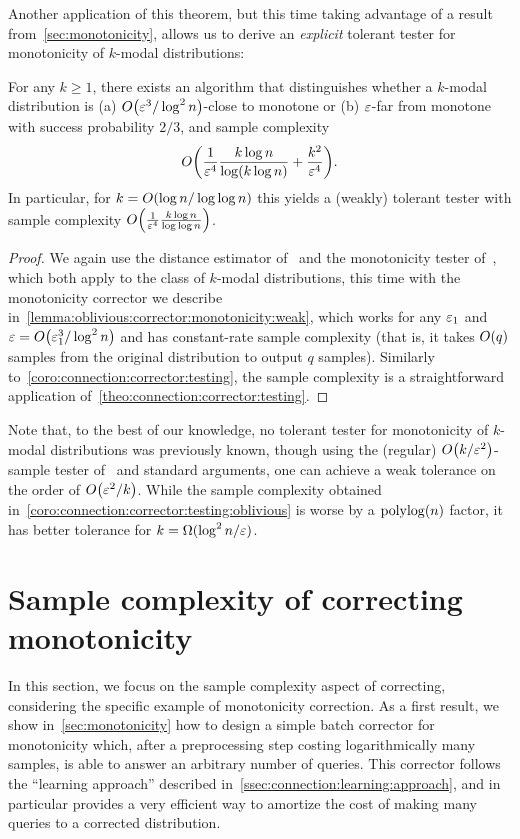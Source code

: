 Another application of this theorem, but this time taking advantage of a result from~\cref{sec:monotonicity}, allows us to derive an \emph{explicit} tolerant tester for monotonicity of $k$-modal distributions:
\begin{corollary}\label{coro:connection:corrector:testing:oblivious}
For any $k\geq 1$, there exists an algorithm that distinguishes whether a $k$-modal distribution is  \textsf{(a)} $\bigO{\eps^3/\log^2 n}$-close to monotone or  \textsf{(b)} $\varepsilon$-far from monotone with success probability $2/3$, and sample complexity
\[
	\bigO{\frac{1}{\eps^4}\frac{k\log n}{\log (k\log n)} +\frac{k^2}{\eps^4} }.
\]
In particular, for $k=\bigO{\log n/\log\log n}$ this yields a (weakly) tolerant tester with sample complexity $\bigO{\frac{1}{\eps^4}\frac{k\log n}{\log\log n} }$.
\end{corollary}
\begin{proof}
 We again use the distance estimator of~\cite{DDSVV:13} and the monotonicity tester of~\cite{DDS:12}, which both apply to  the class of $k$-modal distributions, this time with the monotonicity corrector we describe in~\cref{lemma:oblivious:corrector:monotonicity:weak}, which works for any $\varepsilon_1$ and $\eps=\bigO{\eps_1^3/\log^2 n}$ and has constant-rate sample complexity (that is, it takes $\bigO{q}$ samples from the original distribution to output $q$ samples). Similarly to~\cref{coro:connection:corrector:testing}, the sample complexity is a straightforward application of~\cref{theo:connection:corrector:testing}.
\end{proof}

Note that, to the best of our knowledge, no tolerant tester for 
monotonicity of $k$-modal distributions was previously known, 
though using the (regular) $\bigO{k/\eps^2}$-sample tester 
of~\cite{DDS:12} and standard arguments, one can achieve
a weak tolerance on the order of $\bigO{\eps^2/k}$. 
While the sample complexity obtained
in~\cref{coro:connection:corrector:testing:oblivious} is 
worse by a $\operatorname*{poly}\!\log(n)$ factor, 
it has better tolerance for $k=\Omega(\log^2 n/\varepsilon)$.
\section{Sample complexity of correcting monotonicity}\label{sec:focus:samples}
	In this section, we focus on the sample complexity aspect of correcting, considering the specific example of monotonicity correction. As a first result, we show in~\cref{sec:monotonicity} how to design a simple batch corrector for monotonicity which, after a preprocessing step costing logarithmically many samples, is able to answer an arbitrary number of queries. This corrector follows the ``learning approach'' described in~\cref{ssec:connection:learning:approach}, and in particular provides a very efficient way to amortize the cost of making many queries to a corrected distribution.


